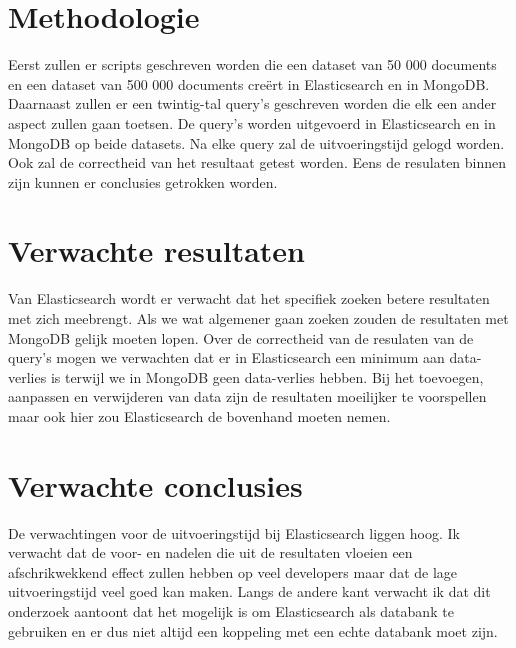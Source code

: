\documentclass[fleqn,10pt]{voorstel}
\begin{document}
	\section{Methodologie}
	\label{sec:methodologie}
	
	Eerst zullen er scripts geschreven worden die een dataset van 50 000 documents en een dataset van 500 000 documents creërt in Elasticsearch en in MongoDB. Daarnaast zullen er een twintig-tal query's geschreven worden die elk een ander aspect zullen gaan toetsen. De query's worden uitgevoerd in Elasticsearch en in MongoDB op beide datasets. Na elke query zal de uitvoeringstijd gelogd worden. Ook zal de correctheid van het resultaat getest worden. Eens de resulaten binnen zijn kunnen er conclusies getrokken worden.
	
	\section{Verwachte resultaten}
	\label{sec:verwachte_resultaten}
	
	Van Elasticsearch wordt er verwacht dat het specifiek zoeken betere resultaten met zich meebrengt. Als we wat algemener gaan zoeken zouden de resultaten met MongoDB gelijk moeten lopen. Over de correctheid van de resulaten van de query's mogen we verwachten dat er in Elasticsearch een minimum aan data-verlies is terwijl we in MongoDB geen data-verlies hebben. Bij het toevoegen, aanpassen en verwijderen van data zijn de resultaten moeilijker te voorspellen maar ook hier zou Elasticsearch de bovenhand moeten nemen.
	
	\section{Verwachte conclusies}
	\label{sec:verwachte_conclusies}
	
	De verwachtingen voor de uitvoeringstijd bij Elasticsearch liggen hoog. Ik verwacht dat de voor- en nadelen die uit de resultaten vloeien een afschrikwekkend effect zullen hebben op veel developers maar dat de lage uitvoeringstijd veel goed kan maken. Langs de andere kant verwacht ik dat dit onderzoek aantoont dat het mogelijk is om Elasticsearch als databank te gebruiken en er dus niet altijd een koppeling met een echte databank moet zijn.
	
	
	\printbibliography[heading=bibintoc]
	
\end{document}
